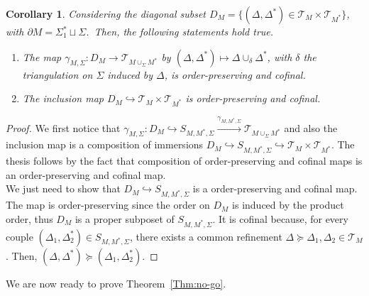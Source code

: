\documentclass[11pt]{article}
\newcommand{\del}{\partial}
\newtheorem{corollary}[proposition]{Corollary}
\theoremstyle{definition}
\numberwithin{equation}{section}
\begin{document}
\begin{corollary}
    \label{diagonalcut}
    Considering the diagonal subset $D_M=\{(\Delta,\Delta^*)\in\mathcal{T}_{M}\times\mathcal{T}_{M^*}\}$, with $\del M=\Sigma_1^*\sqcup\Sigma$.~Then, the following statements hold true.
    \begin{enumerate}
        \item The map $\gamma_{M,\Sigma}:D_{M}\to\mathcal{T}_{M\cup_{\Sigma}M^*}$ by $(\Delta,\Delta^*)\mapsto\Delta\cup_{\delta}\Delta^*$, with $\delta$ the triangulation on $\Sigma$ induced by $\Delta$, is order-preserving and cofinal.
        \item The inclusion map $D_{M}\hookrightarrow\mathcal{T}_{M}\times\mathcal{T}_{M^*}$ is order-preserving and cofinal.
    \end{enumerate}
\end{corollary}
\begin{proof}
We first notice that $\gamma_{M,\Sigma}:D_M\hookrightarrow S_{M,M^*,\Sigma}\xrightarrow{\gamma_{M,M^*,\Sigma}}\mathcal{T}_{M\cup_{\Sigma}M^*}$ and also the inclusion map is a composition of immersions $D_M\hookrightarrow S_{M,M^*,\Sigma}\hookrightarrow\mathcal{T}_{M}\times\mathcal{T}_{M^*}.$ The thesis follows by the fact that composition of order-preserving and cofinal maps is an order-preserving and cofinal map.\\
We just need to show that $D_M\hookrightarrow S_{M,M^*,\Sigma}$ is a order-preserving and cofinal map. The map is order-preserving since the order on $D_{M}$ is induced by the product order, thus $D_{M}$ is a proper subposet of $S_{M,M^*,\Sigma}$. It is cofinal because, for every couple $(\Delta_1,\Delta_2^*)\in S_{M,M^*,\Sigma}$, there exists a common refinement $\Delta\succeq\Delta_1,\Delta_2\in\mathcal{T}_{M}$. Then, $(\Delta,\Delta^*)\succeq(\Delta_1,\Delta_2^*)$.
\end{proof}
\noindent
We are now ready to prove Theorem~\ref{Thm:no-go}.
\smallskip
\end{document}
